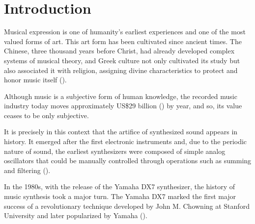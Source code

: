 \documentclass[sigconf,natbib=false]{acmart}
\begin{document}




\maketitle

\section{Introduction}

Musical expression is one of humanity’s earliest experiences and one of the most valued forms of art. This art form has been cultivated since ancient times. The Chinese, three thousand years before Christ, had already developed complex systems of musical theory, and Greek culture not only cultivated its study but also associated it with religion, assigning divine characteristics to protect and honor music itself (\textcite{med1996teoria}).

Although music is a subjective form of human knowledge, the recorded music industry today moves approximately US\$29 billion (\textcite{ifpi2025}) by year, and so, its value ceases to be only subjective.

It is precisely in this context that the artifice of synthesized sound appears in history. It emerged after the first electronic instruments and, due to the periodic nature of sound, the earliest synthesizers were composed of simple analog oscillators that could be manually controlled through operations such as summing and filtering (\textcite{holmes2016electronic}).

In the 1980s, with the release of the Yamaha DX7 synthesizer, the history of music synthesis took a major turn. The Yamaha DX7 marked the first major success of a revolutionary technique developed by John M. Chowning at Stanford University and later popularized by Yamaha (\textcite{claesson2021resynthesis}).
\end{document}
